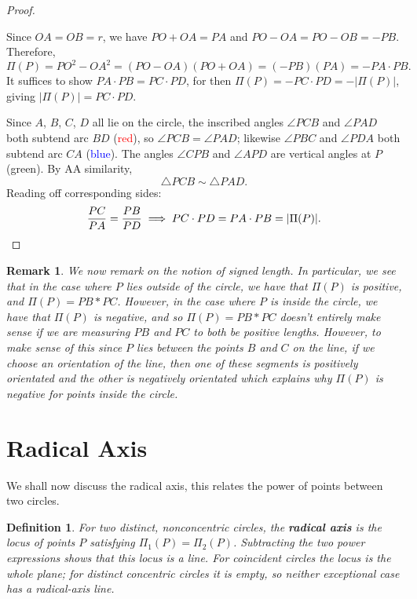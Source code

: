 \documentclass[reqno]{amsart}
\DeclareMathOperator{\1}{\textbf{1}}
\newtheorem{defn}[thm]{Definition}
\newtheorem{remark}[thm]{Remark}
\begin{document}
\begin{proof}
\begin{center}
\begin{tikzpicture}[scale=0.85, font=\small\sffamily, line join=round]
\end{tikzpicture}
\end{center}

Since $OA = OB = r$, we have $PO + OA = PA$ and $PO - OA = PO - OB = -PB$. Therefore,
\[
    \Pi(P) = PO^2 - OA^2 = (PO - OA)(PO + OA) = (-PB)(PA) = -PA \cdot PB.
\]
It suffices to show $PA \cdot PB = PC \cdot PD$, for then $\Pi(P) = -PC \cdot PD = -|\Pi(P)|$, giving $|\Pi(P)| = PC \cdot PD$.

Since $A$, $B$, $C$, $D$ all lie on the circle, the inscribed angles $\angle PCB$ and $\angle PAD$ both subtend arc $BD$ (\textcolor{red}{red}), so $\angle PCB = \angle PAD$; likewise $\angle PBC$ and $\angle PDA$ both subtend arc $CA$ (\textcolor{blue}{blue}). The angles $\angle CPB$ and $\angle APD$ are vertical angles at $P$ (\textcolor{green!60!black}{green}). By AA similarity,
\[
    \triangle PCB \sim \triangle PAD.
\]
Reading off corresponding sides:
\[
    \frac{PC}{PA} = \frac{PB}{PD} \implies PC \cdot PD = PA \cdot PB = |\Pi(P)|. \qedhere
\]
\end{proof}



\begin{remark}
    We now remark on the notion of signed length.
    In particular, we see that in the case where $P$ lies
    outside of the circle, we have that $\Pi(P)$ is positive, 
    and $\Pi(P) = PB * PC$. However, in the case where $P$ is 
    inside the circle, we have that $\Pi(P)$ is negative, and
    so $\Pi(P) = PB * PC$ doesn't entirely make sense if we are
    measuring $PB$ and $PC$ to both be positive lengths. However,
    to make sense of this since $P$ lies between the points $B$
    and $C$ on the line, if we choose an orientation of the line, 
    then one of these segments is positively orientated and the other
    is negatively orientated which explains why $\Pi(P)$ is negative
    for points inside the circle. 
\end{remark}

\section{Radical Axis}

We shall now discuss the radical axis, this relates the power of points between
two circles.

\begin{defn}
    For two distinct, nonconcentric circles, the \textbf{radical axis} is the
    locus of points $P$ satisfying $\Pi_1(P)=\Pi_2(P)$.  Subtracting the two
    power expressions shows that this locus is a line.  For coincident circles
    the locus is the whole plane; for distinct concentric circles it is empty,
    so neither exceptional case has a radical-axis line.
\end{defn}
\end{document}
